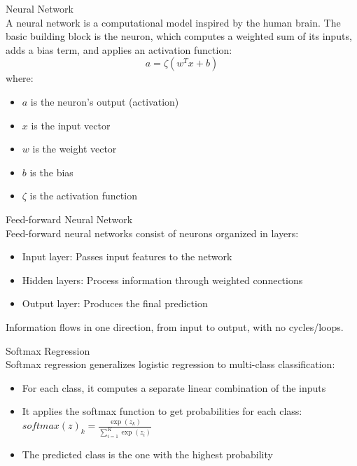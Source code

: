 \begin{definition}{Neural Network}\\
A neural network is a computational model inspired by the human brain. The basic building block is the neuron, which computes a weighted sum of its inputs, adds a bias term, and applies an activation function:
\[a = \zeta(w^T x + b)\]
where:
\begin{itemize}
    \item $a$ is the neuron's output (activation)
    \item $x$ is the input vector
    \item $w$ is the weight vector
    \item $b$ is the bias
    \item $\zeta$ is the activation function
\end{itemize}
\end{definition}

\begin{definition}{Feed-forward Neural Network}\\
Feed-forward neural networks consist of neurons organized in layers:
\begin{itemize}
    \item Input layer: Passes input features to the network
    \item Hidden layers: Process information through weighted connections
    \item Output layer: Produces the final prediction
\end{itemize}
Information flows in one direction, from input to output, with no cycles/loops.
\end{definition}

\begin{definition}{Softmax Regression}\\
Softmax regression generalizes logistic regression to multi-class classification:
\begin{itemize}
    \item For each class, it computes a separate linear combination of the inputs
    \item It applies the softmax function to get probabilities for each class: $softmax(z)_k = \frac{\exp(z_k)}{\sum_{i=1}^{K} \exp(z_i)}$
    \item The predicted class is the one with the highest probability
\end{itemize}
\end{definition}

